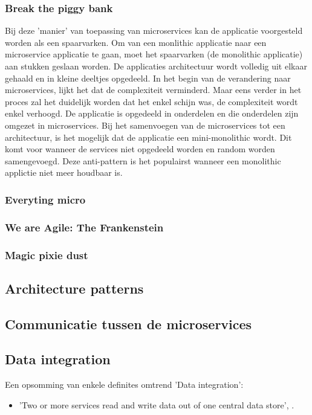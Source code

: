 \subsubsection{Break the piggy bank}
Bij deze 'manier' van toepassing van microservices kan de applicatie voorgesteld worden als een spaarvarken. Om van een monlithic applicatie naar een microservice applicatie te gaan, moet het spaarvarken (de monolithic applicatie) aan stukken geslaan worden. De applicaties architectuur wordt volledig uit elkaar gehaald en in kleine deeltjes opgedeeld. In het begin van de verandering naar microservices, lijkt het dat de complexiteit verminderd. Maar eens verder in het proces zal het duidelijk worden dat het enkel schijn was, de complexiteit wordt enkel verhoogd. 
De applicatie is opgedeeld in onderdelen en die onderdelen zijn omgezet in microservices. Bij het samenvoegen van de microservices tot een architectuur, is het mogelijk dat de applicatie een mini-monolithic wordt. Dit komt voor wanneer de services niet opgedeeld worden en random worden samengevoegd.
Deze anti-pattern is het populairst wanneer een monolithic applictie niet meer houdbaar is. 
\subsubsection{Everyting micro}

\subsubsection{We are Agile: The Frankenstein}

\subsubsection{Magic pixie dust}

\subsection{Architecture patterns}
\subsection{Communicatie tussen de microservices}
\subsection{Data integration}
Een opsomming van enkele definites omtrend 'Data integration':
	\begin{itemize}
		\item 'Two or more services read and write data out of one central data store', \textcite{Aradhye2018}.
	\end{itemize}

